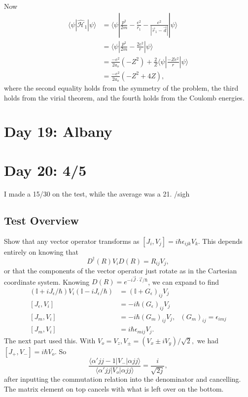 \documentclass[fontsize=12pt]{scrartcl}
\newcommand{\bb}[1]{\mathbb{#1}}
\newcommand{\Id}{\bb{I}}
\newcommand{\la}{\langle}
\newcommand{\ra}{\rangle}
\newcommand{\Ham}{\hat{\mathcal{H}}}
\begin{document}
Now \begin{align*}
\la \psi|\Ham_1|\psi\ra &= \la \psi | \frac{p^2}{2m}-\frac{e^2}{r_1}-\frac{e^2}{|\vec{r}_1-\vec{d}|}|\psi\ra \\
&= \la \psi|\frac{p^2}{2m}-\frac{2e^2}{r}|\psi\ra\\
&= \frac{-e^2}{2a_o}(-Z^2) + \frac{2}{Z}\la \psi|\frac{-Ze^2}{r}|\psi\ra \\
&= \frac{-e^2}{2a_o}(-Z^2+4Z), 
\end{align*} where the second equality holds from the symmetry of the problem, the third holds from the virial theorem, and the fourth holds from the Coulomb energies.




\section{Day 19: Albany}

\section{Day 20: 4/5}

I made a 15/30 on the test, while the average was a 21. /sigh

\subsection{Test Overview}

Show that any vector operator transforms as $[J_i, V_j]=i\hbar \epsilon_{ijk}V_k$. This depends entirely on knowing that $$D^\dagger(R)V_iD(R)=R_{ij}V_j,$$ or that the components of the vector operator just rotate as in the Cartesian coordinate system. Knowing $D(R)=e^{-i\vec{J}\cdot\vec{\epsilon}/\hbar}$, we can expand to find \begin{align*}
(\Id+iJ_\epsilon/\hbar)V_i(\Id-iJ_\epsilon/\hbar)&=(\Id+G_\epsilon)_{ij}V_j\\
[J_\epsilon, V_i] &= -i\hbar (G_\epsilon)_{ij}V_j\\
[J_m, V_i] &= -i\hbar (G_m)_{ij}V_j, \ \ \ (G_m)_{ij}=\epsilon_{imj}\\
[J_m, V_i] &= i \hbar \epsilon_{mij}V_j.
\end{align*} The next part used this. With $V_o = V_z, V_{\pm}=(V_x\pm iV_y)/\sqrt{2},$ we had $[J_+, V_-]=i\hbar V_o$. So $$\frac{\la \alpha' j j-1|V_-|\alpha jj\ra}{\la \alpha' jj| V_o |\alpha jj\ra} = \frac{i}{\sqrt{2j}},$$ after inputting the commutation relation into the denominator and cancelling. The matrix element on top cancels with what is left over on the bottom.
\end{document}
